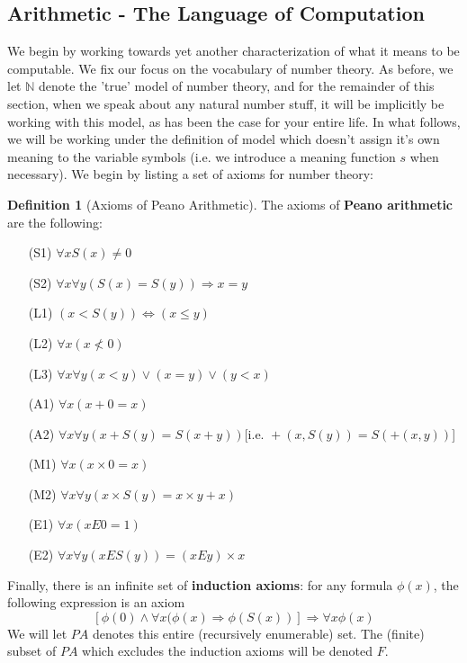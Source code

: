 \documentclass{article}
\theoremstyle{definition}
\newtheorem{definition}{Definition}[section]
\theoremstyle{plain}
\theoremstyle{theorem}
\begin{document}
\subsection{Arithmetic - The Language of Computation}
\par We begin by working towards yet another characterization of what it means to be computable. We fix our focus on the vocabulary of number theory. As before, we let $\mathbb{N}$ denote the 'true' model of number theory, and for the remainder of this section, when we speak about any natural number stuff, it will be implicitly be working with this model, as has been the case for your entire life. In what follows, we will be working under the definition of model which doesn't assign it's own meaning to the variable symbols (i.e. we introduce a meaning function $s$ when necessary).
We begin by listing a set of axioms for number theory:
\newpage
\begin{definition}[Axioms of Peano Arithmetic]
    The axioms of \textbf{Peano arithmetic} are the following:
    \begin{itemize}
        \item[(S1)] $\forall x S(x) \neq 0$
        \item[(S2)] $\forall x \forall y (S(x) = S(y)) \Rightarrow x = y$
        \item[(L1)] $(x < S(y)) \iff (x \leq y)$
        \item[(L2)] $\forall x( x \nless 0)$
        \item[(L3)] $\forall x \forall y (x < y) \vee (x=y) \vee (y < x)$
        \item[(A1)] $\forall x (x+0 = x)$
        \item[(A2)] $\forall x \forall y (x+S(y) = S(x+y)) \textrm{[i.e. } +(x,S(y)) = S(+(x,y))$\textrm{]}
        \item[(M1)] $\forall x (x \times 0 = x)$
        \item[(M2)] $\forall x \forall y (x \times S(y) = x \times y + x)$
        \item[(E1)] $\forall x (xE0 = 1)$
        \item[(E2)] $\forall x \forall y (x E S(y)) = (x E y) \times x$
    \end{itemize}
    Finally, there is an infinite set of \textbf{induction axioms}: for any formula $\phi(x)$, the following expression is an axiom \[[\phi(0) \wedge \forall x (\phi(x) \Rightarrow \phi(S(x))] \Rightarrow \forall x \phi(x) \]
    We will let $PA$ denotes this entire (recursively enumerable) set. The (finite) subset of $PA$ which excludes the induction axioms will be denoted $F$.  
\end{definition}
\end{document}
